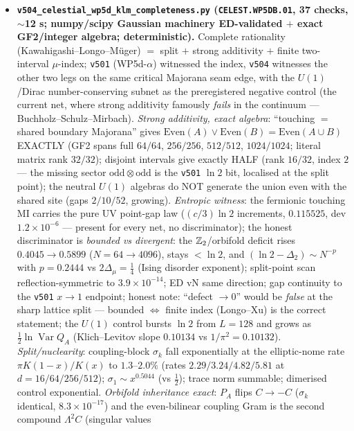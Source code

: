 \documentclass[11pt]{article}
\begin{document}
\begin{itemize}[leftmargin=1.5em]
\item \textbf{\texttt{v504\_celestial\_wp5d\_klm\_completeness.py} (\texttt{CELEST.WP5DB.01}, 37
checks, $\sim$12 s; numpy/scipy Gaussian machinery ED-validated $+$ exact GF2/integer algebra;
deterministic).} Complete rationality (Kawahigashi--Longo--M\"uger) $=$ split $+$ strong additivity
$+$ finite two-interval $\mu$-index; \texttt{v501} (WP5d-$\alpha$) witnessed the index, \texttt{v504}
witnesses the other two legs on the same critical Majorana seam edge, with the $U(1)$/Dirac
number-conserving subnet as the preregistered negative control (the current net, where strong
additivity famously \emph{fails} in the continuum --- Buchholz--Schulz--Mirbach). \emph{Strong
additivity, exact algebra}: ``touching $=$ shared boundary Majorana'' gives
$\mathrm{Even}(A)\vee\mathrm{Even}(B)=\mathrm{Even}(A\cup B)$ EXACTLY (GF2 spans full $64/64$,
$256/256$, $512/512$, $1024/1024$; literal matrix rank $32/32$); disjoint intervals give exactly
HALF (rank $16/32$, index $2$ --- the missing sector $\mathrm{odd}\otimes\mathrm{odd}$ is the
\texttt{v501} $\ln2$ bit, localised at the split point); the neutral $U(1)$ algebras do NOT generate
the union even with the shared site (gaps $2/10/52$, growing). \emph{Entropic witness}: the
fermionic touching MI carries the pure UV point-gap law ($(c/3)\ln2$ increments, $0.115525$, dev
$1.2\times10^{-6}$ --- present for every net, no discriminator); the honest discriminator is
\emph{bounded vs divergent}: the $\mathbb{Z}_2$/orbifold deficit rises $0.4045\to0.5899$ ($N=64\to4096$),
stays $<\ln2$, and $(\ln2-\Delta_2)\sim N^{-p}$ with $p=0.2444$ vs $2\Delta_\mu=\tfrac14$ (Ising
disorder exponent); split-point scan reflection-symmetric to $3.9\times10^{-14}$; ED vN same
direction; gap continuity to the \texttt{v501} $x\to1$ endpoint; honest note: ``defect $\to0$''
would be \emph{false} at the sharp lattice split --- bounded $\Leftrightarrow$ finite index
(Longo--Xu) is the correct statement; the $U(1)$ control bursts $\ln2$ from $L=128$ and grows as
$\tfrac12\ln\operatorname{Var}Q_A$ (Klich--Levitov slope $0.10134$ vs $1/\pi^2=0.10132$).
\emph{Split/nuclearity}: coupling-block $\sigma_k$ fall exponentially at the elliptic-nome rate
$\pi K(1-x)/K(x)$ to $1.3$--$2.0\%$ (rates $2.29/3.24/4.82/5.81$ at $d=16/64/256/512$);
$\sigma_1\sim x^{0.5044}$ (vs $\tfrac12$); trace norm summable; dimerised control exponential.
\emph{Orbifold inheritance exact}: $P_A$ flips $C\to-C$ ($\sigma_k$ identical, $8.3\times10^{-17}$)
and the even-bilinear coupling Gram is the second compound $\Lambda^2C$ (singular values

\end{itemize}
\end{document}
